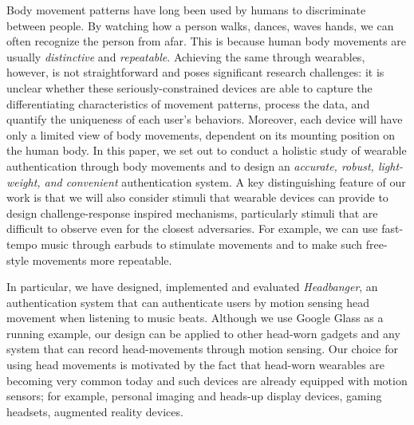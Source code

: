 \vspace{1mm} Body movement
patterns have long been used by humans to discriminate between people. By
watching how a person walks, dances, waves hands, we can often recognize
the person from afar. This is because human body movements are usually
\emph{distinctive} and \emph{repeatable}. Achieving the same through
wearables, however, is not straightforward and poses significant research
challenges: it is unclear whether these seriously-constrained devices are able
to capture the differentiating characteristics of movement patterns, process the data, and quantify the
uniqueness of each user's behaviors. Moreover, each device will have only a
limited view of body movements, dependent on its mounting position on the
human body. In this paper, we set out to conduct a holistic study of wearable
authentication through body movements and to design an \emph{accurate, robust,
light-weight, and convenient} authentication system. A key distinguishing feature of our work
is that we will also consider stimuli that wearable devices can provide to
design challenge-response inspired mechanisms, particularly stimuli that are
difficult to observe even for the closest adversaries. For example, we can use
fast-tempo music through earbuds to stimulate movements and to make such
free-style movements more repeatable.

In particular, we have designed, implemented and evaluated {\em Headbanger},
an authentication system that can authenticate users by motion sensing head movement when listening to music beats. Although we
use Google Glass as a running example, our design can
be applied to other head-worn gadgets and any system that can record
head-movements through motion sensing. Our choice for using head movements is
motivated by the fact that head-worn wearables are becoming very common today
and such devices are already equipped with motion sensors; for example,
personal imaging and heads-up display devices, gaming headsets, augmented reality devices.


